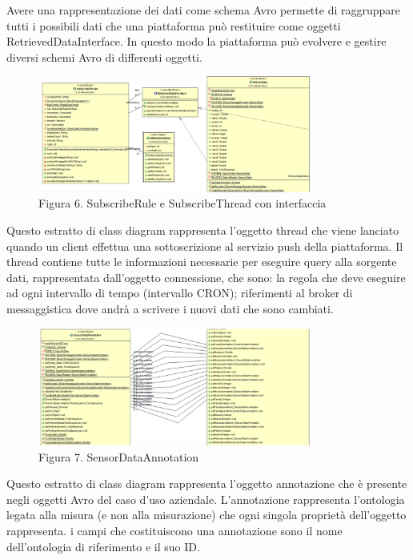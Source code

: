 \par
Avere una rappresentazione dei dati come schema Avro permette di raggruppare tutti i possibili dati che una piattaforma può restituire come oggetti RetrievedDataInterface. In questo modo la piattaforma può evolvere e gestire diversi schemi Avro di differenti oggetti.
\clearpage
\begin{figure}[h]
	\centering
	\includegraphics[width=0.8\textwidth]{subscribe-thread.png}
	\caption*{Figura 6. SubscribeRule e SubscribeThread con interfaccia}
\end{figure}
Questo estratto di class diagram rappresenta l’oggetto thread che viene lanciato quando un client effettua una sottoscrizione al servizio push della piattaforma. Il thread contiene tutte le informazioni necessarie per eseguire query alla sorgente dati, rappresentata dall’oggetto connessione, che sono: la regola che deve eseguire ad ogni intervallo di tempo (intervallo CRON); riferimenti al broker di messaggistica dove andrà a  scrivere i nuovi dati che sono cambiati.
\par \vspace*{2em}
\begin{figure}[h]
	\centering
	\includegraphics[width=0.8\textwidth]{sensor-data-annotation.png}
	\caption*{Figura 7. SensorDataAnnotation}
\end{figure}
Questo estratto di class diagram rappresenta l’oggetto annotazione che è presente negli oggetti Avro del caso d’uso aziendale. L’annotazione rappresenta l’ontologia legata alla misura (e non alla misurazione) che ogni singola proprietà dell’oggetto rappresenta. i campi che costituiscono una annotazione sono il nome dell’ontologia di riferimento e il suo ID.
